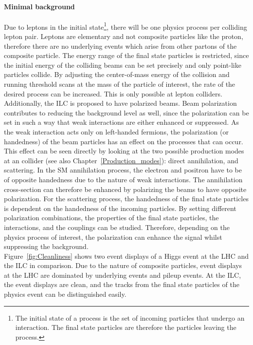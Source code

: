 \paragraph{Minimal background}
Due to leptons in the initial state\footnote{The initial state of a process is the set of incoming particles that undergo an interaction. The final state particles are therefore the particles leaving the process.}, there will be one physics process per colliding lepton pair.
Leptons are elementary and not composite particles like the proton, therefore there are no underlying events which arise from other partons of the composite particle.
The energy range of the final state particles is restricted, since the initial energy of the colliding beams can be set precisely and only point-like particles collide.
By adjusting the center-of-mass energy of the collision and running threshold scans at the mass of the particle of interest, the rate of the desired process can be increased.
This is only possible at lepton colliders.
\\Additionally, the ILC is proposed to have polarized beams. 
Beam polarization contributes to reducing the background level as well, since the polarization can be set in such a way that weak interactions are either enhanced or suppressed.
As the weak interaction acts only on left-handed fermions, the polarization (or handedness) of the beam particles has an effect on the processes that can occur.
This effect can be seen directly by looking at the two possible production modes at an \positron\electron collider (see also Chapter~\ref{Production_modes}):
direct \positron\electron annihilation, and \positron\electron scattering.
In the SM annihilation process, the electron and positron have to be of opposite handedness due to the nature of weak interactions.
The annihilation cross-section can therefore be enhanced by polarizing the beams to have opposite polarization.
For the \positron\electron scattering process, the handedness of the final state particles is dependent on the handedness of the incoming particles.
By setting different polarization combinations, the properties of the final state particles, the interactions, and the couplings can be studied. %
Therefore, depending on the physics process of interest, the polarization can enhance the signal whilst suppressing the background. 
\\Figure~\ref{fig:Cleanliness} shows two event displays of a Higgs event at the LHC and the ILC in comparison.
Due to the nature of composite particles, event displays at the LHC are dominated by underlying events and pileup events.
At the ILC, the event displays are clean, and the tracks from the final state particles of the physics event can be distinguished easily.

